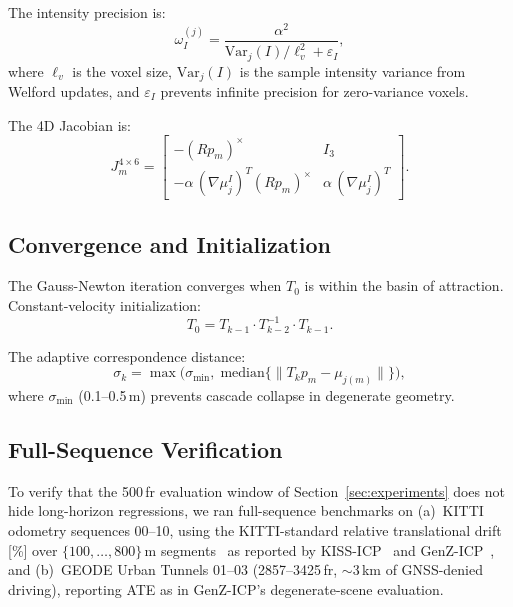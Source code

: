 \documentclass[journal,letterpaper,10pt]{IEEEtran}
\begin{document}
The intensity precision is:
\begin{equation}
  \omega_I^{(j)} = \frac{\alpha^2}{\mathrm{Var}_j(I)/\ell_v^2 + \varepsilon_I},
\end{equation}
where $\ell_v$ is the voxel size, $\mathrm{Var}_j(I)$ is the sample
intensity variance from Welford updates, and $\varepsilon_I$ prevents
infinite precision for zero-variance voxels.

The 4D Jacobian is:
\begin{equation}
  J_m^{4\times6} =
  \begin{bmatrix}
    -(Rp_m)^\times & I_3 \\
    -\alpha\,(\nabla\mu_j^I)^T (Rp_m)^\times & \alpha\,(\nabla\mu_j^I)^T
  \end{bmatrix}.
\end{equation}

\subsection{Convergence and Initialization}\label{app:convergence}

The Gauss-Newton iteration converges when $T_0$ is within the basin
of attraction. Constant-velocity initialization:
\begin{equation}
  T_0 = T_{k-1} \cdot T_{k-2}^{-1} \cdot T_{k-1}.
\end{equation}

The adaptive correspondence distance:
\begin{equation}
  \sigma_k = \max\!\bigl(\sigma_{\min},\;
  \mathrm{median}\bigl\{\|T_k p_m - \mu_{j(m)}\|\bigr\}\bigr),
\end{equation}
where $\sigma_{\min}$ (0.1--0.5\,m) prevents cascade collapse in
degenerate geometry.

\subsection{Full-Sequence Verification}\label{app:fullseq}

To verify that the 500\,fr evaluation window of Section~\ref{sec:experiments}
does not hide long-horizon regressions, we ran full-sequence benchmarks on
(a)~KITTI odometry sequences 00--10, using the KITTI-standard relative
translational drift [\%] over $\{100,\ldots,800\}$\,m
segments~\cite{geiger2013kitti} as reported by
KISS-ICP~\cite{vizzo2023kiss} and GenZ-ICP~\cite{zhang2024genz}, and
(b)~GEODE Urban Tunnels 01--03 (2857--3425\,fr, $\sim$3\,km of
GNSS-denied driving), reporting ATE as in GenZ-ICP's degenerate-scene
evaluation.
\end{document}
